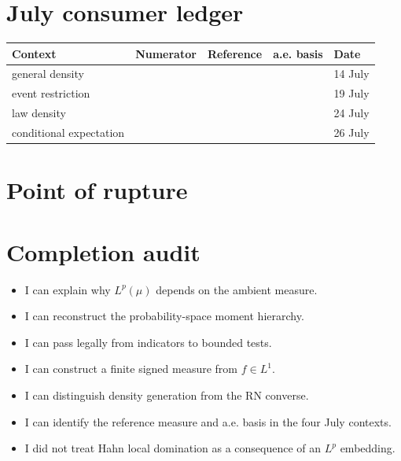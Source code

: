 \section*{July consumer ledger}

\begin{center}
\begin{tabular}{p{30mm}p{35mm}p{35mm}p{32mm}p{22mm}}
\textbf{Context} & \textbf{Numerator} & \textbf{Reference} & \textbf{a.e. basis} & \textbf{Date}\\
\hline
general density & & & & 14 July\\[1.6em]
event restriction & & & & 19 July\\[1.6em]
law density & & & & 24 July\\[1.6em]
conditional expectation & & & & 26 July
\end{tabular}
\end{center}

\section*{Point of rupture}

\section*{Completion audit}

\begin{itemize}
  \item[$\square$] I can explain why $L^p(\mu)$ depends on the ambient measure.
  \item[$\square$] I can reconstruct the probability-space moment hierarchy.
  \item[$\square$] I can pass legally from indicators to bounded tests.
  \item[$\square$] I can construct a finite signed measure from $f\in L^1$.
  \item[$\square$] I can distinguish density generation from the RN converse.
  \item[$\square$] I can identify the reference measure and a.e. basis in the four July contexts.
  \item[$\square$] I did not treat Hahn local domination as a consequence of an $L^p$ embedding.
\end{itemize}

